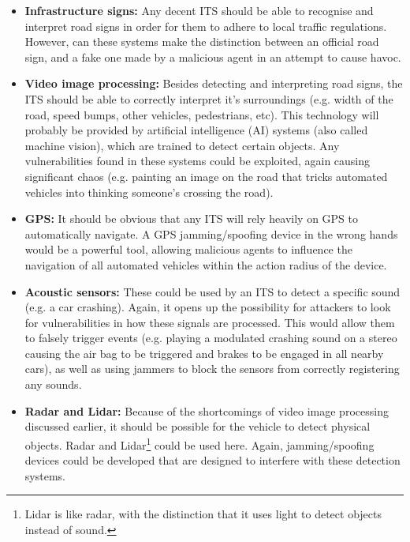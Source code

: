 \begin{itemize}
	\item \textbf{Infrastructure signs:} Any decent ITS should be able to recognise and interpret road signs in order for them to adhere to local traffic regulations. However, can these systems make the distinction between an official road sign, and a fake one made by a malicious agent in an attempt to cause havoc. 
	
	\item \textbf{Video image processing:} Besides detecting and interpreting road signs, the ITS should be able to correctly interpret it's surroundings (e.g. width of the road, speed bumps, other vehicles, pedestrians, etc). This technology will probably be provided by artificial intelligence (AI) systems (also called machine vision), which are trained to detect certain objects. Any vulnerabilities found in these systems could be exploited, again causing significant chaos (e.g. painting an image on the road that tricks automated vehicles into thinking someone's crossing the road).
	
	\item \textbf{GPS:} It should be obvious that any ITS will rely heavily on GPS to automatically navigate. A GPS jamming/spoofing device in the wrong hands would be a powerful tool, allowing malicious agents to influence the navigation of all automated vehicles within the action radius of the device.
	
	\item \textbf{Acoustic sensors:} These could be used by an ITS to detect a specific sound (e.g. a car crashing). Again, it opens up the possibility for attackers to look for vulnerabilities in how these signals are processed. This would allow them to falsely trigger events (e.g. playing a modulated crashing sound on a stereo causing the air bag to be triggered and brakes to be engaged in all nearby cars), as well as using jammers to block the sensors from correctly registering any sounds.
	
	\item \textbf{Radar and Lidar:} Because of the shortcomings of video image processing discussed earlier, it should be possible for the vehicle to detect physical objects. Radar and Lidar\footnote{Lidar is like radar, with the distinction that it uses light to detect objects instead of sound.} could be used here. Again, jamming/spoofing devices could be developed that are designed to interfere with these detection systems.
\end{itemize}

